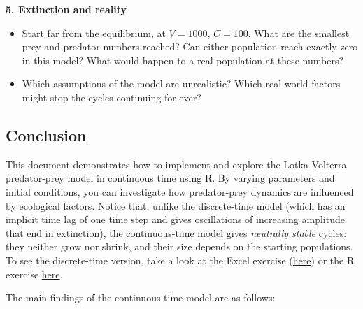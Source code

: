 \documentclass[
  a4paper]{book}
\providecommand{\tightlist}{%
  \setlength{\itemsep}{0pt}\setlength{\parskip}{0pt}}
\begin{document}
\textbf{5. Extinction and reality}

\begin{itemize}
\tightlist
\item
  Start far from the equilibrium, at \(V = 1000\), \(C = 100\). What are the smallest prey and predator numbers reached? Can either population reach exactly zero in this model? What would happen to a real population at these numbers?
\item
  Which assumptions of the model are unrealistic? Which real-world factors might stop the cycles continuing for ever?
\end{itemize}

\subsection{Conclusion}\label{conclusion}

This document demonstrates how to implement and explore the Lotka-Volterra predator-prey model in continuous time using R. By varying parameters and initial conditions, you can investigate how predator-prey dynamics are influenced by ecological factors. Notice that, unlike the discrete-time model (which has an implicit time lag of one time step and gives oscillations of increasing amplitude that end in extinction), the continuous-time model gives \emph{neutrally stable} cycles: they neither grow nor shrink, and their size depends on the starting populations. To see the discrete-time version, take a look at the Excel exercise (\href{https://jonesor.github.io/BB512_Book/lotka-volterra-predator-prey-dynamics.html}{here}) or the R exercise \href{discrete-time-lotka-volterra-predator-prey-model-in-r.html}{here}.

The main findings of the continuous time model are as follows:
\end{document}
